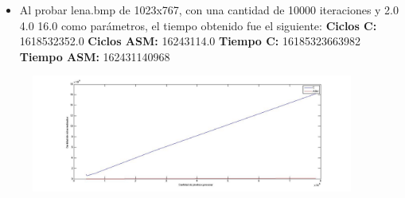 \documentclass[10pt, a4paper]{article}
\begin{document}
\begin{itemize}
\begin{itemize}
\item{Al probar lena.bmp de 1023x767, con una cantidad de 10000 iteraciones y 2.0 4.0 16.0 como parámetros, el tiempo obtenido fue el siguiente:\newline
\newline
\textbf{Ciclos C:}                  1618532352.0\newline
\vspace{0.15cm}
\textbf{Ciclos ASM:}               16243114.0\newline
\textbf{Tiempo C:}                 16185323663982\newline
\textbf{Tiempo ASM:}               162431140968\newline}

\end{itemize}

\begin{figure}[H] %
\begin{center}
\includegraphics[width=300pt]{./ciclosWaves.jpg}
\end{center}
\end{figure}


\end{itemize}
\end{document}
